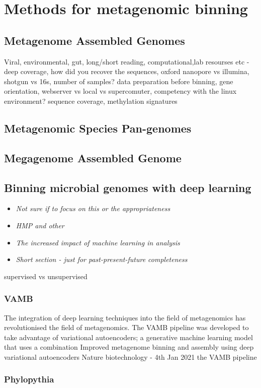 \documentclass{article}
\begin{document}
\section{Methods for metagenomic binning}
\subsection{Metagenome Assembled Genomes}
Viral, environmental, gut, long/short reading, computational,lab resourses etc - deep coverage, how did you recover the sequences, oxford nanopore vs illumina, shotgun vs 16s, number of samples? data preparation before binning, gene orientation, webserver vs local vs supercomuter, competency with the linux environment? sequence coverage, methylation signatures

\subsection{Metagenomic Species Pan-genomes}
\subsection{Megagenome Assembled Genome}

\subsection{Binning microbial genomes with deep learning}
\begin{itemize}
	\item \emph{Not sure if to focus on this or the appropriateness}
	\item \emph{HMP and other }
	\item \emph{The increased impact of machine learning in analysis}
	\item \emph{Short section - just for past-present-future completeness}
\end{itemize}
supervised vs unsupervised
\subsubsection{VAMB}
The integration of deep learning techniques into the field of metagenomics has revolutionised the field of metagenomics.
The VAMB pipeline was developed to take advantage of variational autoencoders; a generative machine learning model that uses a combination 
Improved metagenome binning and assembly using deep variational autoencoders
Nature biotechnology - 4th Jan 2021
the VAMB pipeline \cite{nissenimproved}
\subsubsection{Phylopythia}
\end{document}
